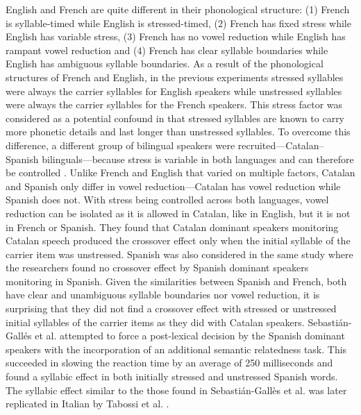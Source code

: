 \documentclass[
12pt, %
english, %
doublespacing, %
nolistspacing, %
liststotoc, %
headsepline, %
chapterinoneline, %
openany, %
]{DoctoralThesis}\usepackage[]{graphicx}\usepackage[]{color}
\begin{document}
English and French are quite different in their phonological structure: (1) French is syllable-timed while English is stressed-timed, (2) French has fixed stress while English has variable stress, (3) French has no vowel reduction while English has rampant vowel reduction and (4) French has clear syllable boundaries while English has ambiguous syllable boundaries. As a result of the phonological structures of French and English, in the previous experiments stressed syllables were always the carrier syllables for English speakers while unstressed syllables were always the carrier syllables for the French speakers. This stress factor was considered as a potential confound in that stressed syllables are known to carry more phonetic details and last longer than unstressed syllables. To overcome this difference, a different group of bilingual speakers were recruited—Catalan–Spanish bilinguals—because stress is variable in both languages and can therefore be controlled \parencite{Sebastian-Galles1992-xd}. Unlike French and English that varied on multiple factors, Catalan and Spanish only differ in vowel reduction—Catalan has vowel reduction while Spanish does not. With stress being controlled across both languages, vowel reduction can be isolated as it is allowed in Catalan, like in English, but it is not in French or Spanish. They found that Catalan dominant speakers monitoring Catalan speech produced the crossover effect only when the initial syllable of the carrier item was unstressed. Spanish was also considered in the same study where the researchers found no crossover effect by Spanish dominant speakers monitoring in Spanish. Given the similarities between Spanish and French, both have clear and unambiguous syllable boundaries nor vowel reduction, it is surprising that they did not find a crossover effect with stressed or unstressed initial syllables of the carrier items as they did with Catalan speakers. Sebastián-Gallés et al. \parencite*{Sebastian-Galles1992-xd} attempted to force a post-lexical decision by the Spanish dominant speakers with the incorporation of an additional semantic relatedness task. This succeeded in slowing the reaction time by an average of 250 milliseconds and found a syllabic effect in both initially stressed and unstressed Spanish words. The syllabic effect similar to the those found in Sebastián-Gallès et al. \parencite*{Sebastian-Galles1992-xd} was later replicated in Italian by Tabossi et al. \parencite*{Tabossi2000-xn}.
\end{document}

